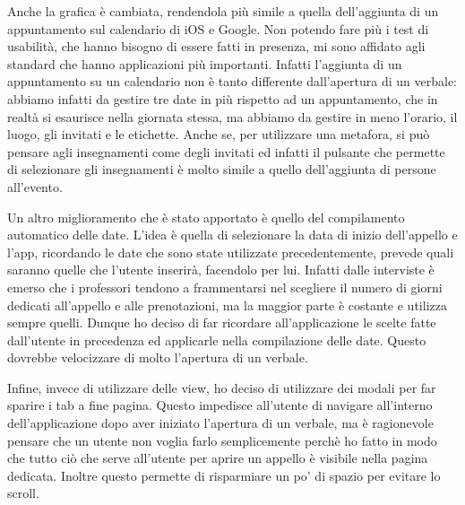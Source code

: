 \documentclass[Lau, oneside]{sapthesis}%
\begin{document}
Anche la grafica è cambiata, rendendola più simile a quella dell'aggiunta di un appuntamento sul calendario di iOS e Google. Non potendo fare più i test di usabilità, che hanno bisogno di essere fatti in presenza, mi sono affidato agli standard che hanno applicazioni più importanti. Infatti l'aggiunta di un appuntamento su un calendario non è tanto differente dall'apertura di un verbale: abbiamo infatti da gestire tre date in più rispetto ad un appuntamento, che in realtà si esaurisce nella giornata stessa, ma abbiamo da gestire in meno l'orario, il luogo, gli invitati e le etichette. Anche se, per utilizzare una metafora, si può pensare agli insegnamenti come degli invitati ed infatti il pulsante che permette di selezionare gli insegnamenti è molto simile a quello dell'aggiunta di persone all'evento.

Un altro miglioramento che è stato apportato è quello del compilamento automatico delle date. L'idea è quella di selezionare la data di inizio dell'appello e l'app, ricordando le date che sono state utilizzate precedentemente, prevede quali saranno quelle che l'utente inserirà, facendolo per lui. Infatti dalle interviste è emerso che i professori tendono a frammentarsi nel scegliere il numero di giorni dedicati all'appello e alle prenotazioni, ma la maggior parte è costante e utilizza sempre quelli. Dunque ho deciso di far ricordare all'applicazione le scelte fatte dall'utente in precedenza ed applicarle nella compilazione delle date.
Questo dovrebbe velocizzare di molto l'apertura di un verbale. %

Infine, invece di utilizzare delle view, ho deciso di utilizzare dei modali per far sparire i tab a fine pagina. Questo impedisce all'utente di navigare all'interno dell'applicazione dopo aver iniziato l'apertura di un verbale, ma è ragionevole pensare che un utente non voglia farlo semplicemente perchè ho fatto in modo che tutto ciò che serve all'utente per aprire un appello è visibile nella pagina dedicata. Inoltre questo permette di risparmiare un po' di spazio per evitare lo scroll.

\end{document}
